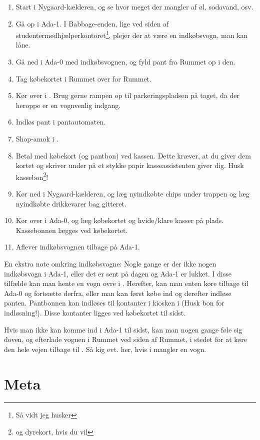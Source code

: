 \begin{enumerate}
\item Start i Nygaard-kælderen, og se hvor meget der mangler af øl,
  sodavand, osv.
\item Gå op i Ada-1. I Babbage-enden, lige ved siden af
  studentermedhjælperkontoret\footnote{Så vidt jeg husker}, plejer der
  at være en indkøbsvogn, man kan låne.
\item Gå ned i Ada-0 med indkøbsvognen, og fyld pant fra Rummet op i
  den.
\item Tag købekortet i Rummet over for Rummet.
\item Kør over i \fotex. Brug gerne rampen op til parkeringspladsen på
  taget, da der heroppe er en vognvenlig indgang.
\item Indløs pant i pantautomaten.
\item Shop-amok i \fotex.
\item Betal med købekort (og pantbon) ved kassen. Dette kræver, at du
  giver dem kortet og skriver under på et stykke papir
  kasseassistenten giver dig. Husk kassebon\footnote{og dyrekort, hvis
    du vil}!
\item Kør ned i Nygaard-kælderen, og læg nyindkøbte chips under
  trappen og læg nyindkøbte drikkevarer bag gitteret.
\item Kør over i Ada-0, og læg købekortet og hvide/klare kasser på
  plads. Kassebonnen lægges ved købekortet.
\item Aflever indkøbsvognen tilbage på Ada-1.
\end{enumerate}

En ekstra note omkring indkøbsvogne: Nogle gange er der ikke nogen
indkøbsvogn i Ada-1, eller det er sent på dagen og Ada-1 er lukket. I
disse tilfælde kan man hente en vogn ovre i \fotex. Herefter, kan man
enten køre tilbage til Ada-0 og fortsætte derfra, eller man kan først
købe ind og derefter indløse panten. Pantbonnen kan indløses til
kontanter i kiosken i \fotex (Husk bon for indløsning!). Disse
kontanter ligges ved købekortet til sidst.

Hvis man ikke kan komme ind i Ada-1 til sidst, kan man nogen gange
føle sig doven, og efterlade vognen i Rummet ved siden af Rummet, i
stedet for at køre den hele vejen tilbage til \fotex. Så kig evt. her,
hvis i mangler en vogn.

\section{Meta}
\label{sec:meta}

